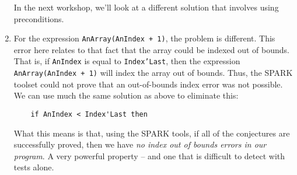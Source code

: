 \documentclass{article}
\begin{document}
\begin{enumerate}
 In the next workshop, we'll look at a different solution that involves using preconditions.

\setcounter{enumi}{7}

 \item For the expression \texttt{AnArray(AnIndex + 1)}, the problem is different. This error here relates to that fact that the array could be indexed out of bounds. That is, if \texttt{AnIndex} is equal to \texttt{Index'Last}, then the expression \texttt{AnArray(AnIndex + 1)} will index the array out of bounds. Thus, the SPARK toolset could not prove that an out-of-bounds index error was not possible. We can use much the same solution as above to eliminate this:

\begin{lstlisting}
    if AnIndex < Index'Last then
\end{lstlisting}

What this means is that, using the SPARK tools, if all of the conjectures are successfully proved, then we have \emph{no index out of bounds errors in our program}. A very powerful property -- and one that is difficult to detect with tests alone.


\begin{comment}
 \item If we open  the file \texttt{code.sum}, we see the following:

 \begin{lstlisting}
 VCs for procedure_task5procedure :
 ----------------------------------------------------------------
| # | From  | To               | Proved By | Dead Path | Status |
|----------------------------------------------------------------
| 1 | start | assert @ finish  | Examiner  | Live      |   EL   |
| 2 | start | assert @ finish  | Examiner  | Live      |   EL   |
| 3 | start | assert @ finish  | Examiner  | Live      |   EL   |
| 4 | start | assert @ finish  | Examiner  | Dead      |   ED   |
 ------------------------------------------------------------------
 \end{lstlisting}

 Thus, the fourth path is a dead path. Opening the file \texttt{task5/task5procedure.zlg}, we further see:

 \begin{lstlisting}
###  Established a contradiction [P-and-not-P] among 
     the following hypotheses:
          H4 & H5.
 \end{lstlisting}

 From the file \texttt{task5/task5procedure.dpc}, we can look at the hypotheses in contradiction:


\end{comment}
\end{enumerate}
\end{document}
